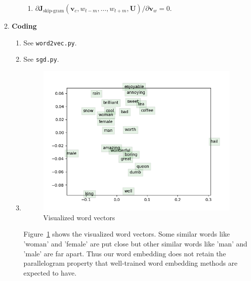 \documentclass[12pt, dvipdfmx]{article}
\begin{document}
\begin{enumerate}[label=\textbf{\arabic*}]
\begin{enumerate}[label=(\alph*)]
\begin{enumerate}[label=(\roman*)]
      \item $\partial\bm{J}_{\textrm{skip-gram}}(\bm{v}_c,w_{t-m},\ldots,w_{t+m},\bm{U})/\partial\bm{v}_w=0.$
    \end{enumerate}
  \end{enumerate}
  \item \textbf{Coding}
  \begin{enumerate}[label=(\alph*)]
    \item See \texttt{word2vec.py}.
    \item See \texttt{sgd.py}.
    \item
    \begin{figure}
      \centering
      \includegraphics{../word_vectors.png}
      \caption{Visualized word vectors}
      \label{fig:word_vectors}
    \end{figure}
    Figure~\ref{fig:word_vectors} shows the visualized word vectors. Some similar words like 'woman' and 'female' are put close but other similar words like 'man' and 'male' are far apart. Thus our word embedding does not retain the parallelogram property that well-trained word embedding methods are expected to have.
  \end{enumerate}
\end{enumerate}
\end{document}
